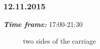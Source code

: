 \subsubsection{12.11.2015}
\textit{\textbf{Time frame:}} 17:00-21:30 \newline


\begin{figure}[H]
	\begin{minipage}[h]{1\linewidth}
		\caption{two sides of the carriage}
	\end{minipage}
\end{figure}

